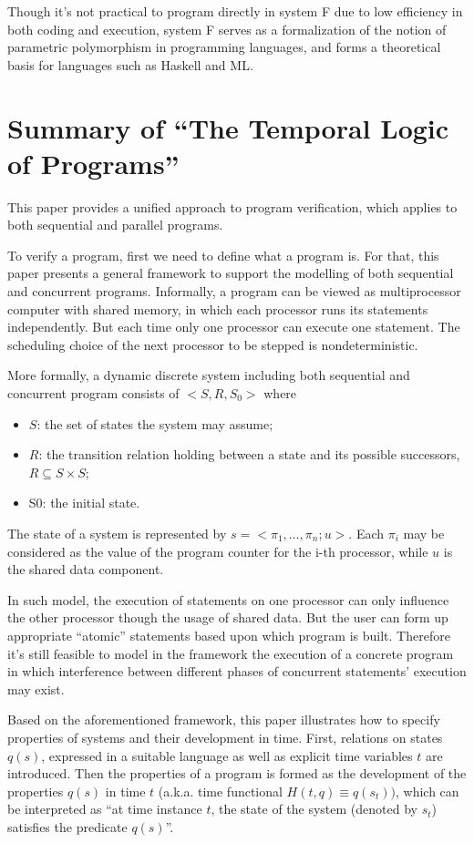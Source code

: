 \documentclass{llncs}
\begin{document}
Though it's not practical to program directly in system F
due to low efficiency in both coding and execution, 
system F serves as a formalization of the notion of parametric
polymorphism in programming languages, and forms a theoretical basis for
languages such as Haskell and ML.



\newpage 
\section{Summary of ``The Temporal Logic of Programs''
  \cite{Pnueli1977Temporal}}
  \label{section:LTL}
This paper provides a unified approach to program verification, which applies
to both sequential and parallel programs.

To verify a program, first we need to define what a program is. For that,
this paper presents a general framework to support the modelling of both
sequential and concurrent programs. Informally, a program can be viewed as
multiprocessor computer with shared memory, in which each processor runs its
statements independently. But each time only one processor can execute
one statement. The scheduling choice of the next processor to be stepped
is nondeterministic.

More formally, a dynamic discrete system including both sequential and
concurrent program consists of $<S, R, S_0>$ where 
\begin{itemize}
\item
$S$: the set of states the system may assume; 
\item
$R$: the transition relation holding between a state and
its possible successors, $R \subseteq S \times S$; 
\item
S0: the initial state.
\end{itemize}
The state of a system is represented by $s = <\pi_1, \dots , \pi_n; u>$. 
Each $\pi_i$
may be considered as the value of the program counter for
the i-th processor, while $u$ is
the shared data component.

In such model, the execution of statements on one processor can only
influence the other processor though the usage of shared data. But the user
can form up appropriate “atomic” statements based upon which program
is built. Therefore it’s still feasible to model in the framework the
execution of a concrete program in which interference between different
phases of concurrent statements’ execution may exist.

Based on the aforementioned framework, this paper illustrates how
to specify properties of systems and their development in time. First, relations
on states $q(s)$, expressed in a suitable language as well as explicit time
variables $t$ are introduced. Then the properties of a program is formed as the
development of the properties $q(s)$ in time $t$ (a.k.a. time functional $H(t,
q) \equiv q(s_t))$, which can be interpreted as “at time instance $t$, the state
of the system (denoted by $s_t$) satisfies the predicate $q(s)$”.
\end{document}
